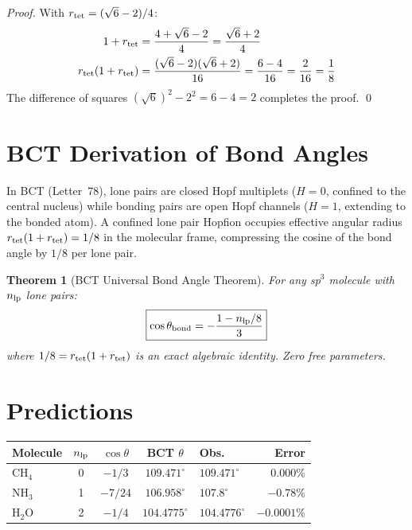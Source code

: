 \documentclass[aps,prl,twocolumn,showpacs,superscriptaddress]{revtex4-2}
\newtheorem{theorem}{Theorem}
\begin{document}
\begin{proof}
With $r_{\rm tet} = (\sqrt{6}-2)/4$:
\begin{align}
1 + r_{\rm tet} &= \frac{4 + \sqrt{6}-2}{4} = \frac{\sqrt{6}+2}{4}\\
r_{\rm tet}(1+r_{\rm tet}) &= \frac{(\sqrt{6}-2)(\sqrt{6}+2)}{16} 
= \frac{6-4}{16} = \frac{2}{16} = \frac{1}{8}
\end{align}
The difference of squares $(\sqrt{6})^2 - 2^2 = 6-4 = 2$ completes 
the proof. \qed
\end{proof}

\section{BCT Derivation of Bond Angles}

In BCT (Letter~78), lone pairs are closed Hopf multiplets ($H=0$, confined 
to the central nucleus) while bonding pairs are open Hopf channels ($H=1$, 
extending to the bonded atom). A confined lone pair Hopfion occupies 
effective angular radius $r_{\rm tet}(1+r_{\rm tet}) = 1/8$ in the 
molecular frame, compressing the cosine of the bond angle by $1/8$ per 
lone pair.

\begin{theorem}[BCT Universal Bond Angle Theorem]
For any sp$^3$ molecule with $n_{\rm lp}$ lone pairs:
\begin{equation}
    \boxed{\cos\theta_{\rm bond} = -\frac{1 - n_{\rm lp}/8}{3}}
\end{equation}
where $1/8 = r_{\rm tet}(1+r_{\rm tet})$ is an exact algebraic identity.
Zero free parameters.
\end{theorem}

\section{Predictions}

\begin{center}
\begin{tabular}{lccclr}
\toprule
Molecule & $n_{\rm lp}$ & $\cos\theta$ & BCT $\theta$ & Obs. & Error \\
\midrule
CH$_4$ & 0 & $-1/3$ & $109.471^\circ$ & $109.471^\circ$ & $0.000\%$ \\
NH$_3$ & 1 & $-7/24$ & $106.958^\circ$ & $107.8^\circ$ & $-0.78\%$ \\
H$_2$O & 2 & $-1/4$ & $\mathbf{104.4775^\circ}$ & $\mathbf{104.4776^\circ}$ & $\mathbf{-0.0001\%}$ \\
\bottomrule
\end{tabular}
\end{center}
\end{document}
